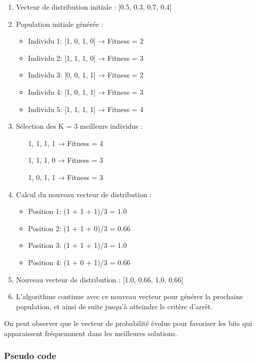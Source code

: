 \documentclass{article}
\begin{document}
\begin{enumerate}
\item Vecteur de distribution initiale : [0.5, 0.3, 0.7, 0.4]

\item Population initiale générée :
    \begin{itemize}
    \item Individu 1: [1, 0, 1, 0] → Fitness = 2
    \item Individu 2: [1, 1, 1, 0] → Fitness = 3
    \item Individu 3: [0, 0, 1, 1] → Fitness = 2
    \item Individu 4: [1, 0, 1, 1] → Fitness = 3
    \item Individu 5: [1, 1, 1, 1] → Fitness = 4
    \end{itemize}

\item Sélection des K = 3 meilleurs individus :
    \begin{itemize}
    \item [1, 1, 1, 1] → Fitness = 4
    \item [1, 1, 1, 0] → Fitness = 3
    \item [1, 0, 1, 1] → Fitness = 3
    \end{itemize}

\item Calcul du nouveau vecteur de distribution :
    \begin{itemize}
    \item Position 1: (1 + 1 + 1)/3 = 1.0
    \item Position 2: (1 + 1 + 0)/3 = 0.66
    \item Position 3: (1 + 1 + 1)/3 = 1.0
    \item Position 4: (1 + 0 + 1)/3 = 0.66
    \end{itemize}

\item Nouveau vecteur de distribution : [1.0, 0.66, 1.0, 0.66]

\item L'algorithme continue avec ce nouveau vecteur pour générer la prochaine population, et ainsi de suite jusqu'à atteindre le critère d'arrêt.
\end{enumerate}
On peut observer que le vecteur de probabilité évolue pour favoriser les bits qui apparaissent fréquemment dans les meilleures solutions.

\subsubsection{Pseudo code}
\end{document}
